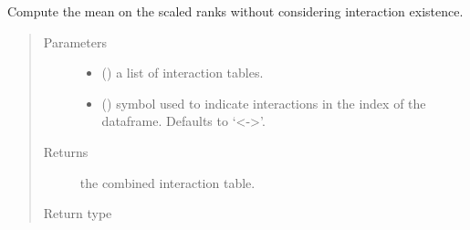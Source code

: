 \documentclass[letterpaper,10pt,english]{sphinxmanual}
\begin{document}
\begin{fulllineitems}
\label{\detokenize{_modules/cosifer.combiners:cosifer.combiners.cit.hard_mean_scaled_ranks_table}}
Compute the mean on the scaled ranks without considering interaction
existence.
\begin{quote}\begin{description}
\item[{Parameters}] \leavevmode\begin{itemize}
\item {} 
 () \textendash{} a list of interaction tables.

\item {} 
 (\sphinxstyleliteralemphasis{\sphinxupquote{, }}) \textendash{} symbol used to indicate
interactions in the index of the dataframe. Defaults to ‘\textless{}-\textgreater{}’.

\end{itemize}

\item[{Returns}] \leavevmode
the combined interaction table.

\item[{Return type}] \leavevmode
{\hyperref[\detokenize{_modules/cosifer.collections:cosifer.collections.interaction_table.InteractionTable}]{}}

\end{description}\end{quote}

\end{fulllineitems}

\end{document}
